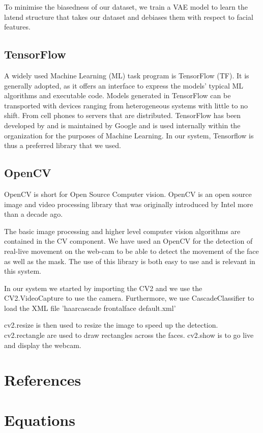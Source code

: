 To minimise the biasedness of our dataset, we train a VAE model to learn the latend structure that takes our dataset and debiases them with respect to facial features.


\subsection{TensorFlow}
A widely used Machine Learning (ML) task program is TensorFlow (TF). It is generally adopted, as it offers an interface to express the models' typical ML algorithms and executable code. Models generated in TensorFlow  can be transported with devices ranging from heterogeneous systems with little to no shift.
From cell phones to servers that are distributed. TensorFlow  has been developed by and is maintained by Google and is used internally within the organization for the purposes of Machine Learning.
In our system, Tensorflow is thus a preferred library that we used.


\subsection{OpenCV}
OpenCV is short for Open Source Computer vision. OpenCV is an open source image and video processing library that was originally introduced by Intel more than a decade ago.  \cite{culjak2012brief}

The basic image processing and higher level computer vision algorithms are contained in the CV component.
We have used an OpenCV for the detection of real-live movement on the web-cam to be able to detect the movement of the face as well as the mask. The use of this library is both easy to use and is relevant in this system. 

In our system we started by importing the CV2 and we use the CV2.VideoCapture to use the camera. Furthermore, we use CascadeClassifier to load the XML file 'haarcascade frontalface default.xml'

cv2.resize is then used to resize the image to speed up the detection. cv2.rectangle are used to draw rectangles across the faces. cv2.show is to go live and display the webcam.




\section{References}

\section{Equations}

